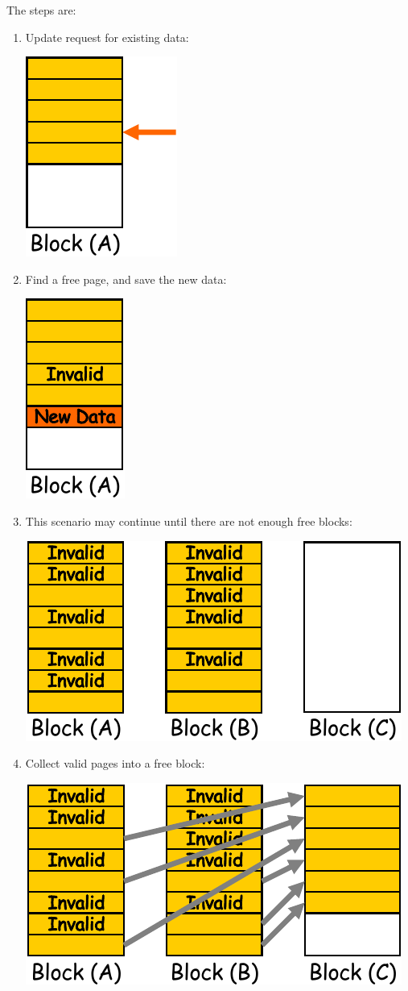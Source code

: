 \begin{examplebox}
    The steps are:
    \begin{enumerate}
        \item Update request for existing data:
        \begin{center}
            \includegraphics[width=.2\textwidth]{img/garbage-collection-1.pdf}
        \end{center}

        \item Find a free page, and save the new data:
        \begin{center}
            \includegraphics[width=.13\textwidth]{img/garbage-collection-2.pdf}
        \end{center}

        \item This scenario may continue until there are not enough free blocks:
        \begin{center}
            \includegraphics[width=.4\textwidth]{img/garbage-collection-3.pdf}
        \end{center}

        \item Collect valid pages into a free block:
        \begin{center}
            \includegraphics[width=.4\textwidth]{img/garbage-collection-4.pdf}
        \end{center}


\end{enumerate}
\end{examplebox}
